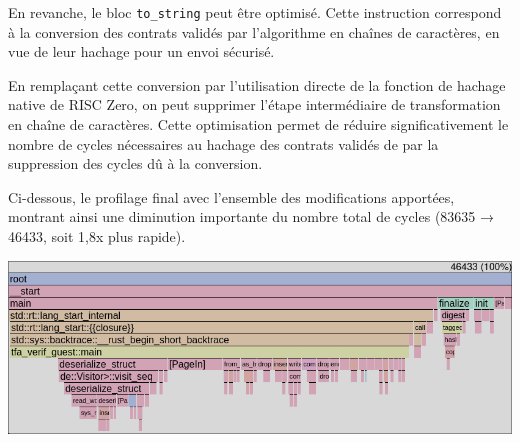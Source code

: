 \documentclass[12pt]{report}
\begin{document}
\medskip

En revanche, le bloc \texttt{to\_string} peut être optimisé. Cette 
instruction correspond à la conversion des contrats validés par 
l'algorithme en chaînes de caractères, en vue de leur hachage 
pour un envoi sécurisé.

\medskip

En remplaçant cette conversion par l'utilisation directe de 
la fonction de hachage native de RISC Zero, on peut supprimer 
l'étape intermédiaire de transformation en chaîne de caractères. 
Cette optimisation permet de réduire significativement le nombre 
de cycles nécessaires au hachage des contrats validés de par la 
suppression des cycles dû à la conversion.

\begin{center}
\end{center}

Ci-dessous, le profilage final avec l'ensemble des modifications
apportées, montrant ainsi une diminution importante du nombre total
de cycles (83635 → 46433, soit 1,8x plus rapide).

\begin{center}
  \includegraphics[width=1\textwidth]{flamegraph_3.png}
\end{center}
\end{document}
